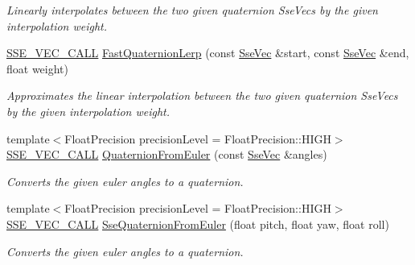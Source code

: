 \begin{DoxyCompactItemize}
\begin{DoxyCompactList}\small\item\em Linearly interpolates between the two given quaternion Sse\+Vecs by the given interpolation weight. \end{DoxyCompactList}\item 
\hyperlink{ssevec__math__defs_8h_a97454f977a5281455cecacce1e8ba670}{S\+S\+E\+\_\+\+V\+E\+C\+\_\+\+C\+A\+L\+L} \hyperlink{group___s_i_m_d_vec_math_ga632ef80a1f66a0de3be83b4133470169}{Fast\+Quaternion\+Lerp} (const \hyperlink{namespacegofxmath_a634570ddcd2496053ee966227080e02f}{Sse\+Vec} \&start, const \hyperlink{namespacegofxmath_a634570ddcd2496053ee966227080e02f}{Sse\+Vec} \&end, float weight)
\begin{DoxyCompactList}\small\item\em Approximates the linear interpolation between the two given quaternion Sse\+Vecs by the given interpolation weight. \end{DoxyCompactList}\item 
{\footnotesize template$<$Float\+Precision precision\+Level = Float\+Precision\+::\+H\+I\+G\+H$>$ }\\\hyperlink{ssevec__math__defs_8h_a97454f977a5281455cecacce1e8ba670}{S\+S\+E\+\_\+\+V\+E\+C\+\_\+\+C\+A\+L\+L} \hyperlink{group___s_i_m_d_vec_math_ga833d20d6dc42c134320a3ad0b77d7b3a}{Quaternion\+From\+Euler} (const \hyperlink{namespacegofxmath_a634570ddcd2496053ee966227080e02f}{Sse\+Vec} \&angles)
\begin{DoxyCompactList}\small\item\em Converts the given euler angles to a quaternion. \end{DoxyCompactList}\item 
{\footnotesize template$<$Float\+Precision precision\+Level = Float\+Precision\+::\+H\+I\+G\+H$>$ }\\\hyperlink{ssevec__math__defs_8h_a97454f977a5281455cecacce1e8ba670}{S\+S\+E\+\_\+\+V\+E\+C\+\_\+\+C\+A\+L\+L} \hyperlink{group___s_i_m_d_vec_math_gab95cb1ddc35f7af91cdf2a12edaf5122}{Sse\+Quaternion\+From\+Euler} (float pitch, float yaw, float roll)
\begin{DoxyCompactList}\small\item\em Converts the given euler angles to a quaternion. \end{DoxyCompactList}\end{DoxyCompactItemize}

